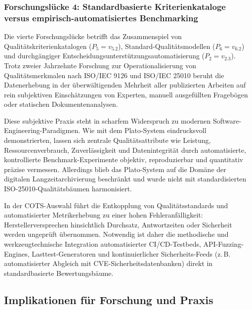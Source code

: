 \subsubsection{Forschungslücke 4: Standardbasierte Kriterienkataloge versus empirisch-automatisiertes Benchmarking}
\label{subsubsec:gap4}

Die vierte Forschungslücke betrifft das Zusammenspiel von Qualitätskriterienkatalogen ($P_5 = v_{5.2}$), Standard-Qualitätsmodellen ($P_6 = v_{6.2}$) und durchgängiger Entscheidungsunterstützungsautomatisierung ($P_2 = v_{2.3}$). Trotz zweier Jahrzehnte Forschung zur Operationalisierung von Qualitätsmerkmalen nach ISO/IEC 9126 und ISO/IEC 25010 beruht die Datenerhebung in der überwältigenden Mehrheit aller publizierten Arbeiten auf rein subjektiven Einschätzungen von Experten, manuell ausgefüllten Fragebögen oder statischen Dokumentenanalysen.

Diese subjektive Praxis steht in scharfem Widerspruch zu modernen Software-Engineering-\-Paradigmen. Wie \textcite{8VHUMEKY} mit dem Plato-System eindrucksvoll demonstrierten, lassen sich zentrale Qualitätsattribute wie Leistung, Ressourcenverbrauch, Zuverlässigkeit und Datenintegrität durch automatisierte, kontrollierte Benchmark-Experi\-mente objektiv, reproduzierbar und quantitativ präzise vermessen. Allerdings blieb das Plato-System auf die Domäne der digitalen Langzeitarchivierung beschränkt und wurde nicht mit standardisierten ISO-25010-Qualitätsbäumen harmonisiert.

In der COTS-Auswahl führt die Entkopplung von Qualitätsstandards und automatisierter Metrikerhebung zu einer hohen Fehleranfälligkeit: Herstellerversprechen hinsichtlich Durchsatz, Antwortzeiten oder Sicherheit werden ungeprüft übernommen. Notwendig ist daher die methodische und werkzeugtechnische Integration automatisierter CI/CD-Testbeds, API-Fuzzing-Engines, Lasttest-Generatoren und kontinuierlicher Sicherheits-Feeds (z.\,B. automatisierter Abgleich mit CVE-Sicherheitsdatenbanken) direkt in standardbasierte Bewertungsbäume.

\subsection{Implikationen für Forschung und Praxis}
\label{subsec:implikationen_forschung_praxis}

